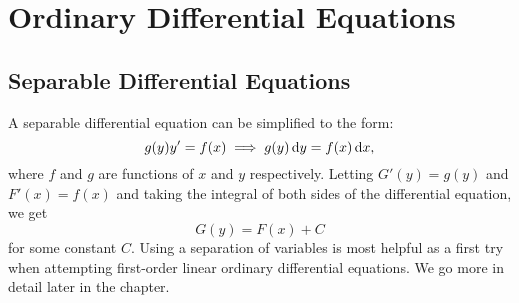 \chapter{Ordinary Differential Equations}
\section{Separable Differential Equations}

A separable differential equation can be simplified to the form:
$$g(y)y'=f(x) \implies g(y)\dif y = f(x) \dif x,$$
where $f$ and $g$ are functions of $x$ and $y$ respectively. Letting
$G'(y)=g(y)$ and $F'(x)=f(x)$ and taking the integral of both sides of the
differential equation, we get $$G(y) = F(x)+C$$ for some constant $C$. Using
a separation of variables is most helpful as a first try when attempting
first-order linear ordinary differential equations. We go more in detail later
in the chapter.

